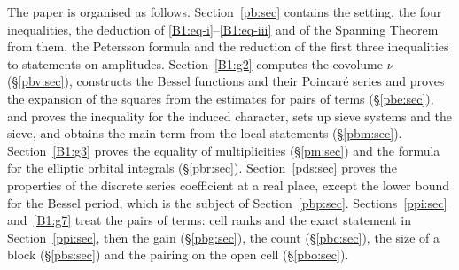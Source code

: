 \documentclass[10pt]{amsart}
\theoremstyle{definition}
\theoremstyle{remark}
\providecommand{\auAz}{\mathcal A_0}
\providecommand{\auDX}{D_X}
\providecommand{\auF}{\mathbb F}
\providecommand{\auG}{\overline G}
\providecommand{\auGL}{\mathrm{GL}}
\providecommand{\auP}{\mathcal P}
\providecommand{\auPl}{\Phi}
\providecommand{\auS}{\mathcal S}
\providecommand{\auSram}{\mathcal S^{\mathrm{ram}}}
\providecommand{\auT}{\mathcal T}
\providecommand{\auU}{\mathrm U}
\providecommand{\aubar}[1]{\overline{#1}}
\providecommand{\audT}{d_{\auT}}
\providecommand{\pbDid}{\mathcal D_{\mathrm{id}}}
\providecommand{\pbDmain}{\mathcal D_{\mathrm{main}}}
\providecommand{\pbR}{\overline R_0}
\providecommand{\pbrpsi}{r_\psi}
\begin{document}
The paper is organised as follows. Section~\ref{pb:sec} contains the setting, the four
inequalities, the deduction of \eqref{B1:eq-i}--\eqref{B1:eq-iii} and of the Spanning Theorem from
them, the Petersson formula and the reduction of the first three inequalities to statements on
amplitudes. Section~\ref{B1:g2} computes the covolume $\nu$ (\S\ref{pbv:sec}), constructs the
Bessel functions and their Poincar\'e series and proves the expansion of the squares from the
estimates for pairs of terms (\S\ref{pbe:sec}), and proves the inequality for the induced
character, sets up sieve systems and the sieve, and obtains the main term from the local
statements (\S\ref{pbm:sec}). Section~\ref{B1:g3} proves the equality of multiplicities
(\S\ref{pm:sec}) and the formula for the elliptic orbital integrals (\S\ref{pbr:sec}).
Section~\ref{pds:sec} proves the properties of the discrete series coefficient at a real place,
except the lower bound for the Bessel period, which is the subject of Section~\ref{pbp:sec}.
Sections~\ref{ppi:sec} and~\ref{B1:g7} treat the pairs of terms: cell ranks and the exact
statement in Section~\ref{ppi:sec}, then the gain (\S\ref{pbg:sec}), the count
(\S\ref{pbc:sec}), the size of a block (\S\ref{pbs:sec}) and the pairing on the open cell
(\S\ref{pbo:sec}).


\providecommand{\auO}{\mathcal O}
\providecommand{\auPl}{\Phi}
\providecommand{\auPa}{\Phi_a}
\providecommand{\auPb}{\Phi_b}
\providecommand{\auS}{\mathcal S}
\providecommand{\auSram}{\mathcal S^{\mathrm{ram}}}
\providecommand{\auT}{\mathcal T}
\providecommand{\auAz}{\mathcal A_0}
\providecommand{\auG}{\overline G}
\providecommand{\auP}{\mathcal P}
\providecommand{\auDX}{D_X}
\providecommand{\audT}{d_{\auT}}
\providecommand{\auNm}{\operatorname{Nm}}
\providecommand{\auU}{\mathrm U}
\providecommand{\auGL}{\mathrm{GL}}
\providecommand{\auA}{\mathbb A}
\providecommand{\auF}{\mathbb F}
\providecommand{\aurd}{\mathrm{rd}_E}
\providecommand{\aubar}[1]{\overline{#1}}
\providecommand{\auf}[1]{\texttt{#1}}
\providecommand{\pbR}{\overline R_0}
\providecommand{\pbUb}{\overline U}
\providecommand{\pbHb}{\overline H}
\providecommand{\pbtr}{\operatorname{tr}}
\providecommand{\pbvol}{\operatorname{vol}}
\providecommand{\pbDid}{\mathcal D_{\mathrm{id}}}
\providecommand{\pbDmain}{\mathcal D_{\mathrm{main}}}
\providecommand{\pbdeg}{\operatorname{deg}}
\providecommand{\pbmass}{\operatorname{mass}}
\providecommand{\pbFix}{\operatorname{Fix}}
\providecommand{\pbpr}{\mathrm{pr}}
\providecommand{\pbrpsi}{r_\psi}
\providecommand{\pbW}{\mathbb W}
\providecommand{\pbg}{\mathsf g}
\providecommand{\pbLM}{\mathrm{LM}}
\providecommand{\pbnat}{\natural}
\providecommand{\pbone}{\mathbf 1}
\providecommand{\pbHS}[1]{\|#1\|}
\providecommand{\pbip}[2]{\langle#1,#2\rangle}
\end{document}

